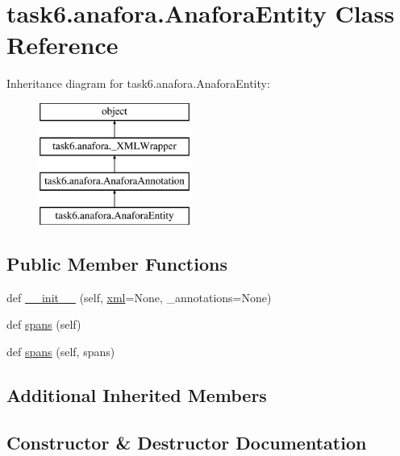 \hypertarget{classtask6_1_1anafora_1_1AnaforaEntity}{}\section{task6.\+anafora.\+Anafora\+Entity Class Reference}
\label{classtask6_1_1anafora_1_1AnaforaEntity}
Inheritance diagram for task6.\+anafora.\+Anafora\+Entity\+:\begin{figure}[H]
\begin{center}
\leavevmode
\includegraphics[height=4.000000cm]{classtask6_1_1anafora_1_1AnaforaEntity}
\end{center}
\end{figure}
\subsection*{Public Member Functions}
\begin{DoxyCompactItemize}
\item 
def \hyperlink{classtask6_1_1anafora_1_1AnaforaEntity_acfd5a97611934979705d236afc9c2504}{\+\_\+\+\_\+init\+\_\+\+\_\+} (self, \hyperlink{classtask6_1_1anafora_1_1__XMLWrapper_abed00085815402c05f9569d349f8dfda}{xml}=None, \+\_\+annotations=None)
\item 
def \hyperlink{classtask6_1_1anafora_1_1AnaforaEntity_ac21bd8b99a0cd7242c397f0133f4db19}{spans} (self)
\item 
def \hyperlink{classtask6_1_1anafora_1_1AnaforaEntity_a11c403442719b721ddf69182bcfb3e37}{spans} (self, spans)
\end{DoxyCompactItemize}
\subsection*{Additional Inherited Members}


\subsection{Constructor \& Destructor Documentation}
\mbox{\label{classtask6_1_1anafora_1_1AnaforaEntity_acfd5a97611934979705d236afc9c2504}} 
